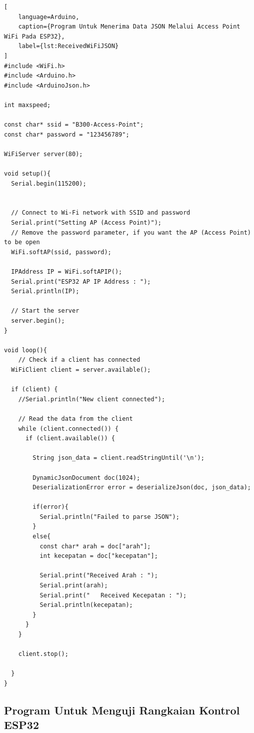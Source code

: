 \begin{lstlisting}[
    language=Arduino,
    caption={Program Untuk Menerima Data JSON Melalui Access Point WiFi Pada ESP32},
    label={lst:ReceivedWiFiJSON}
]
#include <WiFi.h>
#include <Arduino.h>
#include <ArduinoJson.h>

int maxspeed;

const char* ssid = "B300-Access-Point";
const char* password = "123456789";

WiFiServer server(80);

void setup(){
  Serial.begin(115200);


  // Connect to Wi-Fi network with SSID and password
  Serial.print("Setting AP (Access Point)");
  // Remove the password parameter, if you want the AP (Access Point) to be open
  WiFi.softAP(ssid, password);
 
  IPAddress IP = WiFi.softAPIP();
  Serial.print("ESP32 AP IP Address : ");
  Serial.println(IP);

  // Start the server
  server.begin();
}

void loop(){
    // Check if a client has connected
  WiFiClient client = server.available();

  if (client) {
    //Serial.println("New client connected");
    
    // Read the data from the client
    while (client.connected()) {
      if (client.available()) {
    
        String json_data = client.readStringUntil('\n');

        DynamicJsonDocument doc(1024);
        DeserializationError error = deserializeJson(doc, json_data);

        if(error){
          Serial.println("Failed to parse JSON");
        }
        else{
          const char* arah = doc["arah"];
          int kecepatan = doc["kecepatan"];

          Serial.print("Received Arah : ");
          Serial.print(arah);
          Serial.print("   Received Kecepatan : ");
          Serial.println(kecepatan);
        }
      }
    }

    client.stop();

  }
}
\end{lstlisting}

\subsection{Program Untuk Menguji Rangkaian Kontrol ESP32}

